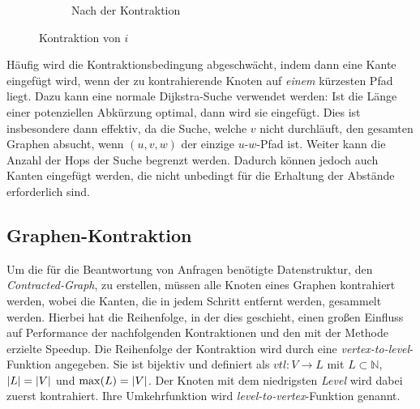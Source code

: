 \begin{figure}[h!]
\begin{subfigure}[b]{0.49\textwidth}
{
    }
    \caption{Nach der Kontraktion}
  \end{subfigure}
  \caption{Kontraktion von $i$}
  \label{graphs:fig:example_contraction}
\end{figure}

Häufig wird die Kontraktionsbedingung abgeschwächt, indem dann eine Kante eingefügt wird, wenn der zu kontrahierende Knoten auf \emph{einem} kürzesten Pfad liegt.
Dazu kann eine normale Dijkstra-Suche verwendet werden: Ist die Länge einer potenziellen Abkürzung optimal, dann wird sie eingefügt.
Dies ist insbesondere dann effektiv, da die Suche, welche $v$ nicht durchläuft, den gesamten Graphen absucht, wenn $(u, v, w)$ der einzige $u$-$w$-Pfad ist.
Weiter kann die Anzahl der Hops der Suche begrenzt werden.
Dadurch können jedoch auch Kanten eingefügt werden, die nicht unbedingt für die Erhaltung der Abstände erforderlich sind.

\subsection{Graphen-Kontraktion}

Um die für die Beantwortung von Anfragen benötigte Datenstruktur, den \emph{Contracted-Graph}, zu erstellen, müssen alle Knoten eines Graphen kontrahiert werden, wobei die Kanten, die in jedem Schritt entfernt werden, gesammelt werden.
Hierbei hat die Reihenfolge, in der dies geschieht, einen großen Einfluss auf Performance der nachfolgenden Kontraktionen und den mit der Methode erzielte Speedup.
Die Reihenfolge der Kontraktion wird durch eine \emph{vertex-to-level}-Funktion angegeben.
Sie ist bijektiv und definiert als ${vtl} \colon V \to L$ mit $L \subset \mathbb{N}$, $\abs{L} = \abs{V}$ und $\max(L) = \abs{V}$.
Der Knoten mit dem niedrigsten \emph{Level} wird dabei zuerst kontrahiert.
Ihre Umkehrfunktion wird \emph{level-to-vertex}-Funktion genannt.

